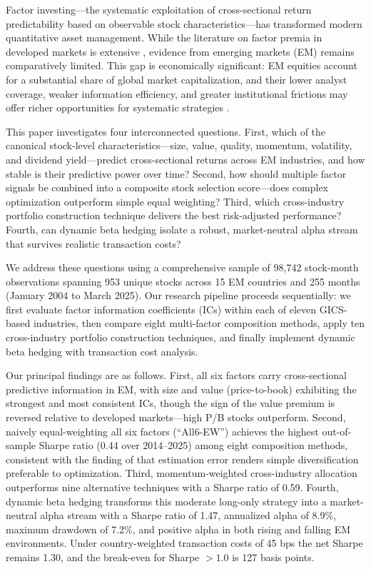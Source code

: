 \documentclass[12pt]{article}
\begin{document}
Factor investing---the systematic exploitation of cross-sectional return predictability based on observable stock characteristics---has transformed modern quantitative asset management. While the literature on factor premia in developed markets is extensive \citep{famafrench1993, famafrench2015, carhart1997}, evidence from emerging markets (EM) remains comparatively limited. This gap is economically significant: EM equities account for a substantial share of global market capitalization, and their lower analyst coverage, weaker information efficiency, and greater institutional frictions may offer richer opportunities for systematic strategies \citep{cakici2013, hanauer2015, hou2011}.

This paper investigates four interconnected questions. First, which of the canonical stock-level characteristics---size, value, quality, momentum, volatility, and dividend yield---predict cross-sectional returns across EM industries, and how stable is their predictive power over time? Second, how should multiple factor signals be combined into a composite stock selection score---does complex optimization outperform simple equal weighting? Third, which cross-industry portfolio construction technique delivers the best risk-adjusted performance? Fourth, can dynamic beta hedging isolate a robust, market-neutral alpha stream that survives realistic transaction costs?

We address these questions using a comprehensive sample of 98,742 stock-month observations spanning 953 unique stocks across 15 EM countries and 255 months (January 2004 to March 2025). Our research pipeline proceeds sequentially: we first evaluate factor information coefficients (ICs) within each of eleven GICS-based industries, then compare eight multi-factor composition methods, apply ten cross-industry portfolio construction techniques, and finally implement dynamic beta hedging with transaction cost analysis.

Our principal findings are as follows. First, all six factors carry cross-sectional predictive information in EM, with size and value (price-to-book) exhibiting the strongest and most consistent ICs, though the sign of the value premium is reversed relative to developed markets---high P/B stocks outperform. Second, naively equal-weighting all six factors (``All6-EW'') achieves the highest out-of-sample Sharpe ratio (0.44 over 2014--2025) among eight composition methods, consistent with the finding of \citet{demiguel2009} that estimation error renders simple diversification preferable to optimization. Third, momentum-weighted cross-industry allocation outperforms nine alternative techniques with a Sharpe ratio of 0.59. Fourth, dynamic beta hedging transforms this moderate long-only strategy into a market-neutral alpha stream with a Sharpe ratio of 1.47, annualized alpha of 8.9\%, maximum drawdown of 7.2\%, and positive alpha in both rising and falling EM environments. Under country-weighted transaction costs of 45 bps the net Sharpe remains 1.30, and the break-even for Sharpe $> 1.0$ is 127 basis points.
\end{document}
